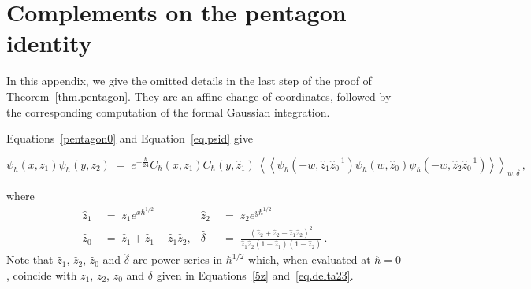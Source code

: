 \documentclass[12pt,reqno]{amsart}
\theoremstyle{definition}
\def\be{\begin{equation}}
\def\ee{\end{equation}}
\def\hb{\hbar}
\def\tz{\hat z}
\def\tdelta{\hat \delta}
\def\llangle{\left\langle\!\left\langle}
\def\rrangle{\right\rangle\!\right\rangle}
\renewcommand{\=}{\;=\;}
\begin{document}

\section{Complements on the pentagon identity}
\label{app.pentagon}

In this appendix, we give the omitted details in the last step of the proof
of Theorem~\ref{thm.pentagon}. They are an affine change of coordinates, followed
by the corresponding computation of the formal Gaussian integration.


Equations~\eqref{pentagon0} and Equation~\eqref{eq.psid} give
\begin{small}
\be
\psi_\hbar(x,z_1)\psi_\hbar(y,z_2)
\=
e^{-\frac{\hbar}{24}}
C_\hbar(x,z_1) C_\hbar(y,\tz_1)\,
\llangle
\psi_\hbar(-w,\tz_1\tz_0^{-1})
\psi_\hbar(w,\tz_0)
\psi_\hbar(-w,\tz_2\tz_0^{-1})
\rrangle_{w,\tdelta}\,,
\ee
\end{small}
where
\be
\label{eq.aB.tdelta}
\begin{aligned}
\tz_1 & \= z_1e^{x\hbar^{1/2}} & 
\tz_2 & \= z_2e^{y\hbar^{1/2}} \\   
\tz_0 & \= \tz_1+\tz_1-\tz_1\tz_2, &  
\tdelta & \= \frac{(\tz_2+\tz_2-\tz_1\tz_2)^2}{\tz_1\tz_2(1-\tz_1)(1-\tz_2)} \,.
\end{aligned}
\ee
Note that $\tz_1$, $\tz_2$, $\tz_0$ and $\tdelta$ are power series in $\hb^{1/2}$
which, when evaluated at $\hb=0$, coincide with $z_1$, $z_2$,
$z_0$ and $\delta$ given in Equations~\eqref{5z} and~\eqref{eq.delta23}. 
\end{document}
